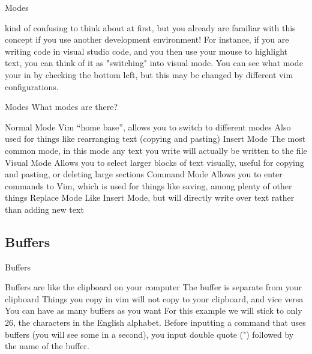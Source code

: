 \documentclass[12pt]{beamer}
\begin{document}
\begin{frame}{Modes}
\begin{outline}
 kind of confusing to think about at first, but you already are familiar with this concept if you use another development environment!
        \1 For instance, if you are writing code in visual studio code, and you then use your mouse to highlight text, you can think of it as "switching" into visual mode.
        \1 You can see what mode your in by checking the bottom left, but this may be changed by different vim configurations.
    \end{outline}
\end{frame}

\begin{frame}{Modes}
    {\large What modes are there?}
    \begin{outline}
    {
        \1 Normal Mode
        \2 {\scriptsize Vim “home base”, allows you to switch to different modes}
        \2 {\scriptsize Also used for things like rearranging text (copying and pasting)}
        \1Insert Mode
        \2 {\scriptsize The most common mode, in this mode any text you write will actually be written to the file}
        \1Visual Mode
        \2 {\scriptsize Allows you to select larger blocks of text visually, useful for copying and pasting, or deleting large sections}
        \1Command Mode
        \2 {\scriptsize Allows you to enter commands to Vim, which is used for things like saving, among plenty of other things}
        \1Replace Mode
        \2 {\scriptsize Like Insert Mode, but will directly write over text rather than adding new text}
        }
    \end{outline}
    
\end{frame}

\subsection{Buffers}
\begin{frame}{Buffers}
    \begin{outline}
        \1 Buffers are like the clipboard on your computer
\2 The buffer is separate from your clipboard
\2 Things you copy in vim will not copy to your clipboard, and vice versa
\1 You can have as many buffers as you want
\2 For this example we will stick to only 26, the characters in the English alphabet.
\1 Before inputting a command that uses buffers (you will see some in a second), you input double quote (") followed by the name of the buffer.
    \end{outline}
\end{frame}
\end{document}
